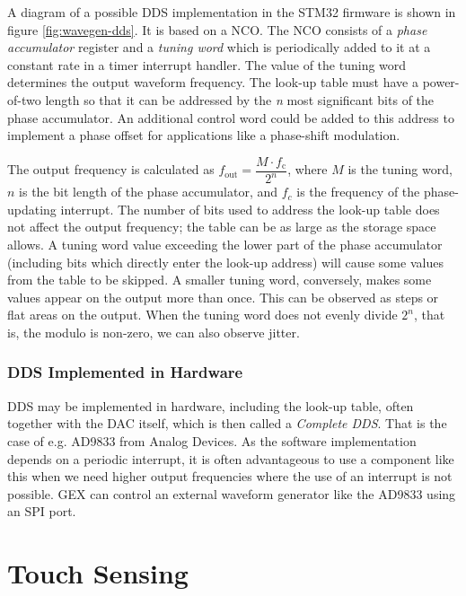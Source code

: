 A diagram of a possible \gls{DDS} implementation in the STM32 firmware is shown in figure \ref{fig:wavegen-dds}. It is based on a \gls{NCO}. The \gls{NCO} consists of a \textit{phase accumulator} register and a \textit{tuning word} which is periodically added to it at a constant rate in a timer interrupt handler. The value of the tuning word determines the output waveform frequency. The look-up table must have a power-of-two length so that it can be addressed by the \textit{n} most significant bits of the phase accumulator. An additional control word could be added to this address to implement a phase offset for applications like a phase-shift modulation.

The output frequency is calculated as \(f_\mathrm{out} = \dfrac{M\cdot f_\mathrm{c}}{2^n}\), where $M$ is the tuning word, $n$ is the bit length of the phase accumulator, and $f_c$ is the frequency of the phase-updating interrupt. The number of bits used to address the look-up table does not affect the output frequency; the table can be as large as the storage space allows. A tuning word value exceeding the lower part of the phase accumulator (including bits which directly enter the look-up address) will cause some values from the table to be skipped. A smaller tuning word, conversely, makes some values appear on the output more than once. This can be observed as steps or flat areas on the output. When the tuning word does not evenly divide $2^n$, that is, the modulo is non-zero, we can also observe jitter.

\subsubsection{DDS Implemented in Hardware}

DDS may be implemented in hardware, including the look-up table, often together with the \gls{DAC} itself, which is then called a \textit{Complete \gls{DDS}}. That is the case of e.g. AD9833 from Analog Devices. As the software implementation depends on a periodic interrupt, it is often advantageous to use a component like this when we need higher output frequencies where the use of an interrupt is not possible. GEX can control an external waveform generator like the AD9833 using an \gls{SPI} port.

\section{Touch Sensing} \label{sec:theory-touch}

